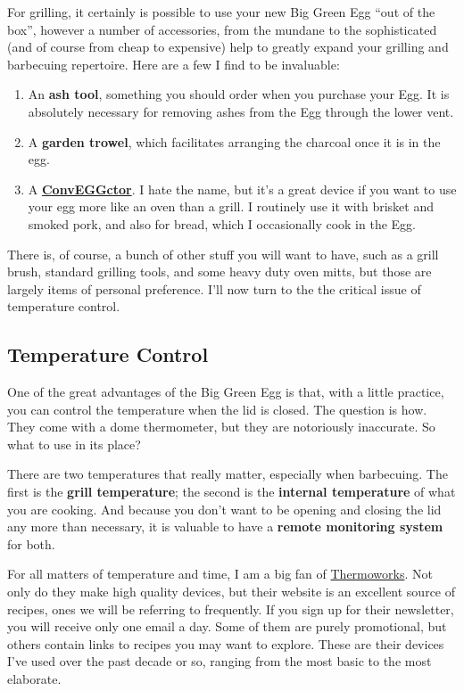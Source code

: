 \documentclass[
]{book}
\providecommand{\tightlist}{%
  \setlength{\itemsep}{0pt}\setlength{\parskip}{0pt}}
\begin{document}
For grilling, it certainly is possible to use your new Big Green Egg ``out of the box'', however a number of accessories, from the mundane to the sophisticated (and of course from cheap to expensive) help to greatly expand your grilling and barbecuing repertoire. Here are a few I find to be invaluable:

\begin{enumerate}
\def\labelenumi{\arabic{enumi}.}
\tightlist
\item
  An \textbf{ash tool}, something you should order when you purchase your Egg. It is absolutely necessary for removing ashes from the Egg through the lower vent.\\
\item
  A \textbf{garden trowel}, which facilitates arranging the charcoal once it is in the egg.
\item
  A \href{https://biggreenegg.com/product/conveggtor/}{\textbf{ConvEGGctor}}. I hate the name, but it's a great device if you want to use your egg more like an oven than a grill. I routinely use it with brisket and smoked pork, and also for bread, which I occasionally cook in the Egg.
\end{enumerate}

There is, of course, a bunch of other stuff you will want to have, such as a grill brush, standard grilling tools, and some heavy duty oven mitts, but those are largely items of personal preference. I'll now turn to the the critical issue of temperature control.

\hypertarget{temperature-control}{%
\subsection{Temperature Control}\label{temperature-control}}

One of the great advantages of the Big Green Egg is that, with a little practice, you can control the temperature when the lid is closed. The question is how. They come with a dome thermometer, but they are notoriously inaccurate. So what to use in its place?

There are two temperatures that really matter, especially when barbecuing. The first is the \textbf{grill temperature}; the second is the \textbf{internal temperature} of what you are cooking. And because you don't want to be opening and closing the lid any more than necessary, it is valuable to have a \textbf{remote monitoring system} for both.

For all matters of temperature and time, I am a big fan of \href{https://www.thermoworks.com/}{Thermoworks}. Not only do they make high quality devices, but their website is an excellent source of recipes, ones we will be referring to frequently. If you sign up for their newsletter, you will receive only one email a day. Some of them are purely promotional, but others contain links to recipes you may want to explore. These are their devices I've used over the past decade or so, ranging from the most basic to the most elaborate.
\end{document}
